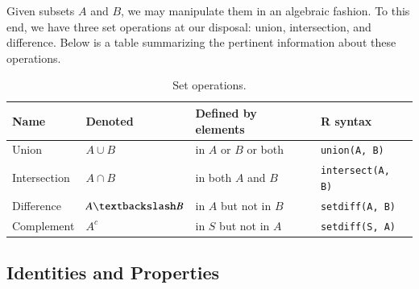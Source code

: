 \documentclass[captions=tableheading]{scrbook}
\begin{document}
Given subsets \(A\) and \(B\), we may manipulate them in an algebraic fashion. To this end, we have three set operations at our disposal: union, intersection, and difference. Below is a table summarizing the pertinent information about these operations.

\begin{table}[htb]
\caption[Set operations]{Set operations.} \label{tab:Set-Operations}
\begin{center}
\begin{tabular}{llll}
 Name          &  Denoted                &  Defined by elements        &  \textsf{R} syntax         \\
\hline
 Union         &  \(A\cup B\)            &  in \(A\) or \(B\) or both  &  \texttt{union(A, B)}      \\
 Intersection  &  \(A\cap B\)            &  in both \(A\) and \(B\)    &  \texttt{intersect(A, B)}  \\
 Difference    &  \(A\textbackslash B\)  &  in \(A\) but not in \(B\)  &  \texttt{setdiff(A, B)}    \\
 Complement    &  \(A^{c}\)              &  in \(S\) but not in \(A\)  &  \texttt{setdiff(S, A)}    \\
\end{tabular}
\end{center}
\end{table}
\subsection{Identities and Properties}
\label{sec-21-1-2}
\end{document}
